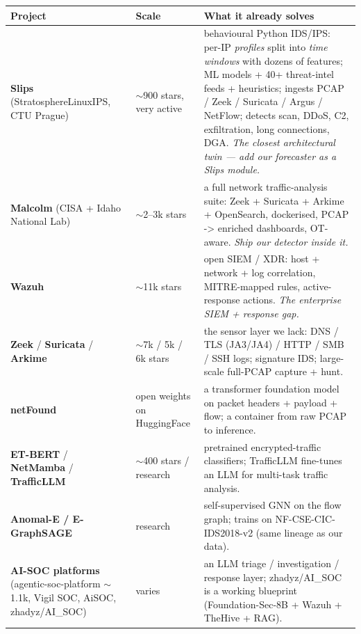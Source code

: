 \documentclass[11pt,a4paper]{article}
\begin{document}
\begin{table}[H]\centering\small
\begin{tabular}{@{}p{3.2cm}p{2cm}p{9cm}@{}}
\toprule
\textbf{Project} & \textbf{Scale} & \textbf{What it already solves} \\ \midrule
\textbf{Slips} (StratosphereLinuxIPS, CTU Prague) & $\sim$900 stars, very active
& behavioural Python IDS/IPS: per-IP \emph{profiles} split into \emph{time
windows} with dozens of features; ML models + 40+ threat-intel feeds +
heuristics; ingests PCAP / Zeek / Suricata / Argus / NetFlow; detects scan,
DDoS, C2, exfiltration, long connections, DGA. \emph{The closest architectural
twin --- add our forecaster as a Slips module.} \\
\textbf{Malcolm} (CISA + Idaho National Lab) & $\sim$2--3k stars & a full network
traffic-analysis suite: Zeek + Suricata + Arkime + OpenSearch, dockerised,
PCAP -> enriched dashboards, OT-aware. \emph{Ship our detector inside
it.} \\
\textbf{Wazuh} & $\sim$11k stars & open SIEM / XDR: host + network + log
correlation, MITRE-mapped rules, active-response actions. \emph{The enterprise
SIEM + response gap.} \\
\textbf{Zeek} / \textbf{Suricata} / \textbf{Arkime} & $\sim$7k / 5k / 6k stars &
the sensor layer we lack: DNS / TLS (JA3/JA4) / HTTP / SMB / SSH logs; signature
IDS; large-scale full-PCAP capture + hunt. \\
\textbf{netFound} & open weights on HuggingFace & a transformer foundation model
on packet headers + payload + flow; a container from raw PCAP to inference. \\
\textbf{ET-BERT} / \textbf{NetMamba} / \textbf{TrafficLLM} & $\sim$400 stars /
research & pretrained encrypted-traffic classifiers; TrafficLLM fine-tunes an
LLM for multi-task traffic analysis. \\
\textbf{Anomal-E / E-GraphSAGE} & research & self-supervised GNN on the flow
graph; trains on NF-CSE-CIC-IDS2018-v2 (same lineage as our data). \\
\textbf{AI-SOC platforms} (agentic-soc-platform $\sim$1.1k, Vigil SOC, AiSOC,
zhadyz/AI\_SOC) & varies & an LLM triage / investigation / response layer;
zhadyz/AI\_SOC is a working blueprint (Foundation-Sec-8B + Wazuh + TheHive +
RAG). \\
\bottomrule
\end{tabular}
\end{table}
\end{document}
